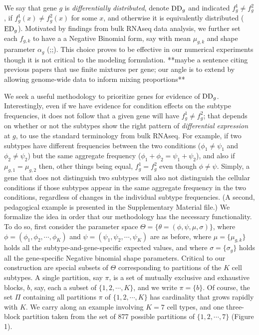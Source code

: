 \documentclass[11pt]{amsart}
\begin{document}
We say that gene $g$ is {\em differentially distributed}, denote ${\rm DD}_g$ and indicated
$f_g^1 \neq f_g^2$,
if $f_g^1(x) \neq f_g^2(x)$ for some $x$, and otherwise it is equivalently distributed
(${\rm ED}_g$). Motivated by findings from bulk RNAseq data analysis, we further
set each $f_{g,k}$ to have a a Negative Binomial form, say with mean $\mu_{g,k}$
and shape parameter $\alpha_g$ (\cite{ref:Leng};\cite{DES};\cite{ref:Des}). 
This choice proves to be effective in our numerical experiments though it is 
not critical to
the modeling formulation. **maybe a sentence citing previous papers that use finite mixtures
per gene; our angle is to extend by allowing genome-wide data to inform mixing proportions**

We seek a useful methodology to prioritize genes for evidence
of ${\rm DD}_g$.  Interestingly, even if we have evidence for condition effects
on the subtype frequencies, it does not follow that a given
gene will have $f^1_g \neq f^2_g$; that depends on whether or not the subtypes
show the right pattern of {\em differential expression} at $g$, to use the 
standard terminology from bulk RNAseq.  For example, if two subtypes have 
different frequencies between the two conditions ($\phi_1 \neq \psi_1$ and 
 $\phi_2 \neq \psi_2$) but the same aggregate frequency
($\phi_1+\phi_2 = \psi_1 + \psi_2$),  and also  if $\mu_{g,1} = \mu_{g,2}$
then, other things being equal, $f^1_g = f^2_g$ even though $\phi \neq \psi$.
Simply, a gene that does not distinguish two subtypes will also not distinguish
the cellular conditions if those subtypes appear in the same aggregate frequency
in the two conditions, regardless of changes in the individual subtype 
frequencies. (A second, pedagogical example is presented in the Supplementary
Material file.)  We formalize the idea in order that our methodology
has the necessary functionality.  To do so,  first consider the parameter space 
$\Theta = \{ \theta=(\phi, \psi,\mu, \sigma)  \}$,
where $\phi=(\phi_1, \phi_2, \cdots, \phi_K)$ and $\psi=(\psi_1, \psi_2, \cdots, \psi_K)$ 
are as before, where $\mu = \{ \mu_{g,k} \}$ holds  all the subtype-and-gene-specific expected
values, and where $\sigma = \{ \sigma_g \}$ holds all the gene-specific Negative binomial
shape parameters.  Critical to our construction are special subsets of $\Theta$ corresponding
to partitions of the $K$ cell subtypes.  A single partition, say $\pi$, is a set of
mutually exclusive and exhaustive blocks, $b$, say, each a subset of $\{1, 2, 
\cdots, K\}$, and we write $\pi = \{ b \}$.  Of course,
the set $\Pi$ containing all partitions $\pi$ of $\{1,2, \cdots, K\}$
 has cardinality that grows rapidly with $K$. 
 We carry along an example
involving $K=7$ cell types, and one three-block partition taken
from the set of 877 possible partitions of $\{1, 2, \cdots, 7\}$ (Figure 1).
\end{document}
